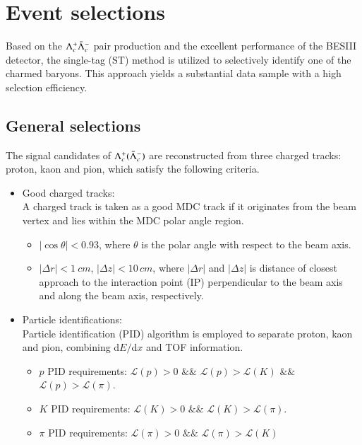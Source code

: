 \clearpage
\section{Event selections}
\label{sec:selections}

Based on the $\Lambda_{c}^{+}\bar{\Lambda}_{c}^{-}$ pair production and the excellent performance of the BESIII detector, the single-tag (ST) method is utilized to selectively identify one of the charmed baryons. This approach yields a substantial data sample with a high selection efficiency. 

\subsection{General selections}
\label{sec:general_cuts}
The signal candidates of $\Lambda_{c}^{+}(\bar{\Lambda}_{c}^{-})$ are reconstructed from three charged tracks: proton, kaon and pion, which satisfy the following criteria. 
\begin{itemize}
    \item Good charged tracks: \\
    A charged track is taken as a good MDC track if it originates from the beam vertex and lies within the MDC polar angle region.
    \begin{itemize}
        \item $|\cos\theta|<0.93$, where $\theta$ is the polar angle with respect to the beam axis.
        \item $|\Delta r|<1~\unit{cm}$, $|\Delta z|<10\,\unit{cm}$, where $|\Delta r|$ and $|\Delta z|$ is distance of closest approach to the interaction point (IP) perpendicular to the beam axis and along the beam axis, respectively.
    \end{itemize}
    
    \item Particle identifications: \\
    Particle identification (PID) algorithm is employed to separate proton, kaon and pion, combining d$E/$d$x$ and TOF information.
    \begin{itemize}
        \item $p$ PID requirements:  $\mathcal{L}(p)>0$ $\mathcal{\&\&}$ $\mathcal{L}(p)>\mathcal{L}(K)$ $\mathcal{\&\&}$ $\mathcal{L}(p)>\mathcal{L}(\pi)$.
        \item $K$ PID requirements: $\mathcal{L}(K)>0$ $\mathcal{\&\&}$ $\mathcal{L}(K)>\mathcal{L}(\pi)$.
        \item $\pi$ PID requirements:  $\mathcal{L}(\pi)>0$ $\mathcal{\&\&}$ $\mathcal{L}(\pi)>\mathcal{L}(K)$
    \end{itemize}
\end{itemize}


